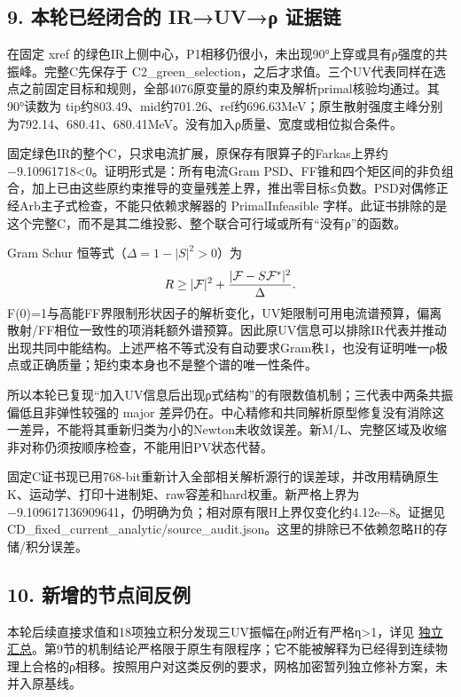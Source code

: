 \documentclass[
  11pt,
  a4paper,
]{article}
\begin{document}
\subsection{9. 本轮已经闭合的 IR→UV→ρ
证据链}\label{ux672cux8f6eux5df2ux7ecfux95edux5408ux7684-iruvux3c1-ux8bc1ux636eux94fe}

在固定 xref
的绿色IR上侧中心，P1相移仍很小，未出现90°上穿或具有ρ强度的共振峰。完整C先保存于
C2\_green\_selection，之后才求值。三个UV代表同样在选点之前固定目标和规则，全部4076原变量的原约束及解析primal核验均通过。其90°读数为
tip约803.49、mid约701.26、ref约696.63MeV；原生散射强度主峰分别为792.14、680.41、680.41MeV。没有加入ρ质量、宽度或相位拟合条件。

固定绿色IR的整个C，只求电流扩展，原保存有限算子的Farkas上界约−9.10961718\textless0。证明形式是：所有电流Gram
PSD、FF锥和四个矩区间的非负组合，加上已由这些原约束推导的变量残差上界，推出零目标≤负数。PSD对偶修正经Arb主子式检查，不能只依赖求解器的
PrimalInfeasible
字样。此证书排除的是这个完整C，而不是其二维投影、整个联合可行域或所有``没有ρ''的函数。

Gram Schur 恒等式（\(\Delta=1-|S|^2>0\)）为 \[
R\ge |\mathcal F|^2+{|\mathcal F-S\mathcal F^*|^2\over\Delta}.
\]
F(0)=1与高能FF界限制形状因子的解析变化，UV矩限制可用电流谱预算，偏离散射/FF相位一致性的项消耗额外谱预算。因此原UV信息可以排除IR代表并推动出现共同中能结构。上述严格不等式没有自动要求Gram秩1，也没有证明唯一ρ极点或正确质量；矩约束本身也不是整个谱的唯一性条件。

所以本轮已复现``加入UV信息后出现ρ式结构''的有限数值机制；三代表中两条共振偏低且非弹性较强的
major
差异仍在。中心精修和共同解析原型修复没有消除这一差异，不能将其重新归类为小的Newton未收敛误差。新M/L、完整区域及收缩非对称仍须按顺序检查，不能用旧PV状态代替。

固定C证书现已用768-bit重新计入全部相关解析源行的误差球，并改用精确原生K、运动学、打印十进制矩、raw容差和hard权重。新严格上界为
−9.109617136909641，仍明确为负；相对原有限H上界仅变化约4.12e−8。证据见
CD\_fixed\_current\_analytic/source\_audit.json。这里的排除已不依赖忽略H的存储/积分误差。

\subsection{10.
新增的节点间反例}\label{ux65b0ux589eux7684ux8282ux70b9ux95f4ux53cdux4f8b}

本轮后续直接求值和18项独立积分发现三UV振幅在ρ附近有严格η\textgreater1，详见
\href{HELD_INTER_NODE_ISSUE_ZH.md}{独立汇总}。第9节的机制结论严格限于原生有限程序；它不能被解释为已经得到连续物理上合格的ρ相移。按照用户对这类反例的要求，网格加密暂列独立修补方案，未并入原基线。
\end{document}
